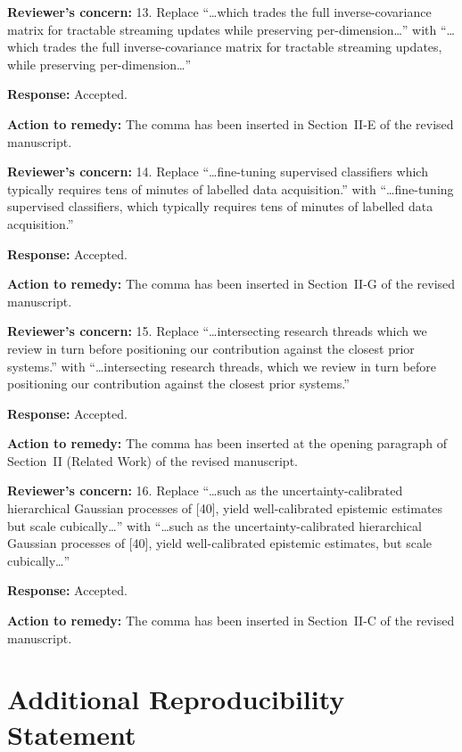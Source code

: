 \documentclass[11pt,a4paper]{article}
\newcommand{\Concern}[1]{\smallskip\noindent\textbf{\textcolor{concern}{Reviewer's concern:}} #1\par}
\newcommand{\Response}[1]{\noindent\textbf{\textcolor{response}{Response:}} #1\par}
\newcommand{\Action}[1]{\noindent\textbf{\textcolor{action}{Action to remedy:}} #1\par}
\begin{document}
\Concern{13. Replace ``\ldots which trades the full inverse-covariance matrix for tractable streaming updates while preserving per-dimension\ldots'' with ``\ldots which trades the full inverse-covariance matrix for tractable streaming updates, while preserving per-dimension\ldots''}
\Response{Accepted.}
\Action{The comma has been inserted in Section~II-E of the revised manuscript.}

\Concern{14. Replace ``\ldots fine-tuning supervised classifiers which typically requires tens of minutes of labelled data acquisition.'' with ``\ldots fine-tuning supervised classifiers, which typically requires tens of minutes of labelled data acquisition.''}
\Response{Accepted.}
\Action{The comma has been inserted in Section~II-G of the revised manuscript.}

\Concern{15. Replace ``\ldots intersecting research threads which we review in turn before positioning our contribution against the closest prior systems.'' with ``\ldots intersecting research threads, which we review in turn before positioning our contribution against the closest prior systems.''}
\Response{Accepted.}
\Action{The comma has been inserted at the opening paragraph of Section~II (Related Work) of the revised manuscript.}

\Concern{16. Replace ``\ldots such as the uncertainty-calibrated hierarchical Gaussian processes of [40], yield well-calibrated epistemic estimates but scale cubically\ldots'' with ``\ldots such as the uncertainty-calibrated hierarchical Gaussian processes of [40], yield well-calibrated epistemic estimates, but scale cubically\ldots''}
\Response{Accepted.}
\Action{The comma has been inserted in Section~II-C of the revised manuscript.}

\section*{Additional Reproducibility Statement}
\end{document}
